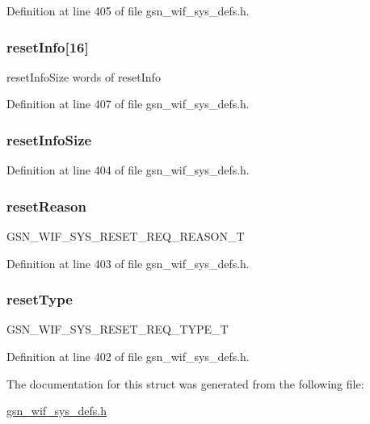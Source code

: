 Definition at line 405 of file gsn\_\-wif\_\-sys\_\-defs.h.

\hypertarget{a00362_ab5521c89f8f524c9a3e9fa8e6591b9f8}{
\subsubsection[{resetInfo}]{ {\bf resetInfo}\mbox{[}16\mbox{]}}}
\label{a00362_ab5521c89f8f524c9a3e9fa8e6591b9f8}
resetInfoSize words of resetInfo 

Definition at line 407 of file gsn\_\-wif\_\-sys\_\-defs.h.

\hypertarget{a00362_af784980100bfb4e57308fee9850b394b}{
\subsubsection[{resetInfoSize}]{ {\bf resetInfoSize}}}
\label{a00362_af784980100bfb4e57308fee9850b394b}


Definition at line 404 of file gsn\_\-wif\_\-sys\_\-defs.h.

\hypertarget{a00362_a860e10ca47301c26f0cc214d9aaa74b9}{
\subsubsection[{resetReason}]{ {\bf resetReason}}}
\label{a00362_a860e10ca47301c26f0cc214d9aaa74b9}
GSN\_\-WIF\_\-SYS\_\-RESET\_\-REQ\_\-REASON\_\-T 

Definition at line 403 of file gsn\_\-wif\_\-sys\_\-defs.h.

\hypertarget{a00362_a424379d8fb70c92b5ebe7450172ed356}{
\subsubsection[{resetType}]{ {\bf resetType}}}
\label{a00362_a424379d8fb70c92b5ebe7450172ed356}
GSN\_\-WIF\_\-SYS\_\-RESET\_\-REQ\_\-TYPE\_\-T 

Definition at line 402 of file gsn\_\-wif\_\-sys\_\-defs.h.



The documentation for this struct was generated from the following file:\begin{DoxyCompactItemize}
\item 
\hyperlink{a00612}{gsn\_\-wif\_\-sys\_\-defs.h}\end{DoxyCompactItemize}
